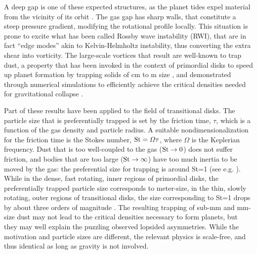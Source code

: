 \documentclass[apj]{emulateapj}
\def\blue#1{\textcolor{blue}{#1}}
\newcommand{\St}{{\rm St}}
\begin{document}
A deep gap is one of these expected structures, as the planet tides expel material from the vicinity of its orbit 
\citep{Papaloizou-Lin84,Lin-Papaloizou86a,Lin-Papaloizou86b,Nelson00,Masset-Snellgrove01,Paardekooper-Mellema04,Quillen04,deValBorro06,Klahr-Kley06,Lyra09a,Zhu11,Kley12}. 
The gas gap has sharp walls, that constitute a steep pressure gradient, modifying the rotational profile locally. 
This situation is prone to excite what has been called Rossby wave
instability (RWI), that are in fact  ``edge modes'' 
\citep{Lovelace-Hohlfeld78,Toomre81,Papaloizou-Pringle84,Papaloizou-Pringle85,Hawley87,Lovelace99,Varniere-Tagger06,deValBorro07,Lyra08,Lyra09a,Lyra09b,
Meheut10,Meheut12a,Meheut12b,Meheut12c,Lin-Papaloizou11a,Lin-Papaloizou11b,Lin-Papaloizou12,Lyra-MacLow12,Lin12,Lin13} 
akin to Kelvin-Helmholtz instability, thus converting the extra shear
into vorticity. The large-scale vortices that result are well-known to trap 
dust, a property that has been invoked in the context of primordial disks to
speed up planet formation by trapping solids of cm to m size \citep{Barge-Sommeria95,Adams-Watkins95,Tanga96,Klahr-Henning97,Hodgson-Brandenburg98,Chavanis00,delaFuenteMarcos-Barge01,Johansen04,Inaba-Barge06}, and demonstrated through numerical simulations to efficiently achieve the
critical densities needed for gravitational collapse
\citep{Lyra08,Lyra09a,Lyra09b}. 

Part of these results have been applied to the field of
transitional disks. The particle size that is
preferentially trapped is set by the friction time, $\tau$, which is a
function of the gas density and particle radius. A suitable nondimensionalization for the
friction time is the Stokes number, $\St = \varOmega \tau$,
where $\varOmega$ is the Keplerian frequency. Dust that is too
well-coupled to the gas ($\St\rightarrow 0$) does not suffer friction, and bodies
that are too large ($\St\rightarrow \infty$) have too much inertia to be moved by the
gas: the preferential size for trapping is around \St=1 (see e.g. \citealt{Youdin-Goodman05,Youdin08}).
While in the dense, fast rotating, inner regions of primordial disks,
the preferentially trapped particle size corresponds to meter-size, in
the thin, slowly rotating, outer regions of transitional
disks, the size corresponding to \St=1 drops by about three orders of
magnitude \blue{\citep{Brauer07,Pinilla12a}}. The resulting trapping of sub-mm and mm-size dust may not
lead to the critical densities necessary to form planets, but they may
well explain the puzzling observed lopsided asymmetries. While the 
motivation and particle sizes are different, the relevant physics 
is scale-free, and thus identical as long as gravity is not involved. 
\end{document}
